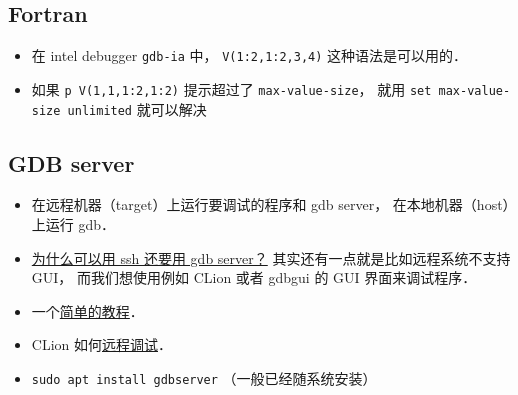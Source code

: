 \subsection{Fortran}
\begin{itemize}
\item 在 intel debugger \verb`gdb-ia` 中， \verb`V(1:2,1:2,3,4)` 这种语法是可以用的．
\item 如果 \verb`p V(1,1,1:2,1:2)` 提示超过了 \verb`max-value-size`， 就用 \verb`set max-value-size unlimited` 就可以解决
\end{itemize}

\subsection{GDB server}
\begin{itemize}
\item 在远程机器（target）上运行要调试的程序和 gdb server， 在本地机器（host）上运行 gdb．
\item \href{https://stackoverflow.com/questions/69176457/the-difference-between-gdbserver-and-remote-gdb}{为什么可以用 ssh 还要用 gdb server？} 其实还有一点就是比如远程系统不支持 GUI， 而我们想使用例如 CLion 或者 gdbgui 的 GUI 界面来调试程序．
\item 一个\href{https://www.thegeekstuff.com/2014/04/gdbserver-example/}{简单的教程}．
\item CLion 如何\href{https://www.jetbrains.com/help/clion/remote-debug.html}{远程调试}．
\item \verb|sudo apt install gdbserver| （一般已经随系统安装）
\end{itemize}
